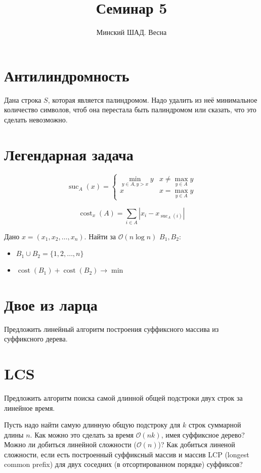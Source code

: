 \documentclass[addpoints]{exam}
\title{Семинар 5}
\author{Минский ШАД. Весна}
\DeclareMathOperator{\cost}{cost}
\DeclareMathOperator{\suc}{suc}
\begin{document}
\maketitle

\section{Антилиндромность}

Дана строка $S$, которая является палиндромом. Надо удалить из неё минимальное количество символов, чтоб она перестала быть палиндромом или сказать, что это сделать невозможно.

\section{Легендарная задача}


$$
\suc_A(x) = 
 \begin{cases}
  \min\limits_{y \in A, y > x} y & x \neq \max\limits_{y \in A}{y} \\
  x & x = \max\limits_{y \in A}{y}
 \end{cases}
$$

$$\cost_x(A) = \sum\limits_{i \in A} |x_i - x_{\suc_A(i)}|$$

Дано $x = (x_1, x_2, \ldots, x_n)$. Найти за $\mathcal{O}(n \log{n})$ $B_1, B_2$:

\begin{itemize}
\item $B_1 \cup B_2 = \{1, 2, \ldots, n\}$
\item $\cost(B_1) + \cost(B_2) \to \min$
\end{itemize}

\section{Двое из ларца}

Предложить линейный алгоритм построения суффиксного массива из суффиксного дерева. 

\section{LCS}

Предложить алгоритм поиска самой длинной общей подстроки двух строк за линейное время.

Пусть надо найти самую длинную общую подстроку для $k$ строк суммарной длины $n$. Как можно это сделать за время $\mathcal{O}(nk)$, имея суффиксное дерево? Можно ли добиться линейной сложности ($\mathcal{O}(n)$)? Как добиться линеной сложности, если есть построенный суффиксный массив и массив LCP (longest common prefix) для двух соседних (в отсортированном порядке) суффиксов?
\end{document}
